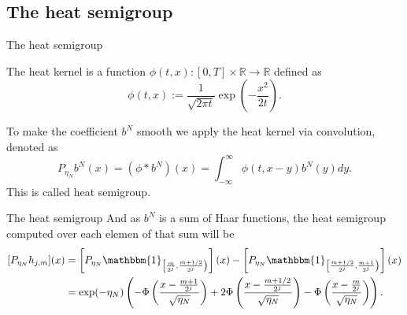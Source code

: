 \documentclass{beamer}
\begin{document}
\subsection{The heat semigroup}
\begin{frame}{The heat semigroup}
        \begin{definition}
                The heat kernel is a function
                $ \phi(t,x): [0,T] \times \mathbb{R} \to \mathbb{R} $
                defined as
                \begin{equation*}
                        \phi(t,x) := \frac{1}{\sqrt{2 \pi t} } \exp \left( - \frac{x^{2}}{2t}\right) .
                \end{equation*}
        \end{definition}
        To make the coefficient
        $ b^{N} $
        smooth we apply the heat kernel via convolution, denoted as
        \begin{equation*}
                P_{\eta_{N}} b^{N} (x) = (\phi * b^{N})(x) = \int_{-\infty}^{\infty} \phi(t, x - y) b^{N}(y) dy.
        \end{equation*}
        This is called {\color{red}heat semigroup}.
\end{frame}

\begin{frame}{The heat semigroup}
        And as
        $ b^{N} $
        is a sum of Haar functions, the heat semigroup computed over each elemen of that sum will be
        \begin{equation*}
                \begin{split}
                        [P_{\eta_{N}} h_{j,m}](x)
                        &=
                        \left[P_{\eta_{N}} \mathbbm{1}_{\left[\frac{m}{2^j}, \frac{m + 1/2}{2^j}\right)}\right](x)
                        - \left[P_{\eta_{N}} \mathbbm{1}_{\left[\frac{m + 1/2}{2^j}, \frac{m + 1}{2^j}\right)}\right](x)
                        \\
                        &=
                        \exp(-\eta_{N})
                        \left(
                        - \Phi \left( \frac{x - \frac{m + 1}{2^{j}}}{\sqrt{\eta_{N}}} \right)
                        + 2 \Phi \left( \frac{x - \frac{m + 1/2}{2^{j}}}{\sqrt{\eta_{N}}} \right)
                        - \Phi \left( \frac{x - \frac{m}{2^{j}}}{\sqrt{\eta_{N}}} \right)
                        \right).
                \end{split}
        \end{equation*}
\end{frame}
\end{document}
